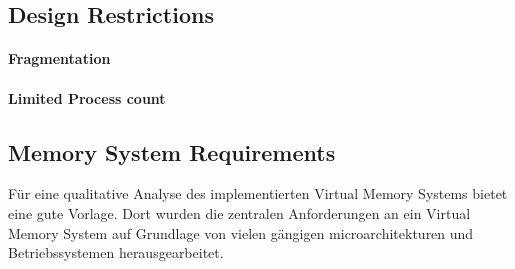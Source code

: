 

\subsection{Design Restrictions} %





\paragraph*{Fragmentation}
\paragraph*{Limited Process count}

\subsection{Memory System Requirements} %
Für eine qualitative Analyse des implementierten Virtual Memory Systems bietet \cite{jacobSoftwaremanagedAddressTranslation1997}
eine gute Vorlage. Dort wurden die zentralen Anforderungen an ein Virtual Memory System auf Grundlage
von vielen gängigen microarchitekturen und Betriebssystemen herausgearbeitet.



